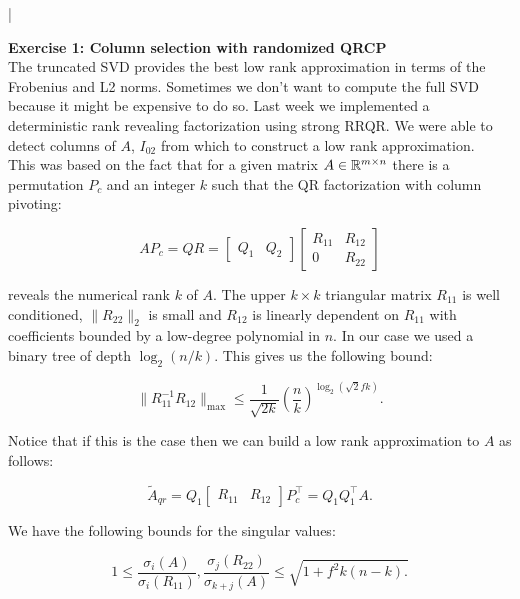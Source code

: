 \documentclass[11pt]{article}
\begin{document}
\lstset{frameround=fttt,language=Matlab}

\lstMakeShortInline[columns=fixed]|



{\bf{Exercise 1: Column selection with randomized QRCP}} \\

The truncated SVD provides the best low rank approximation in terms of the Frobenius and L2 norms. Sometimes we don't want to compute the full SVD because it might be expensive to do so. Last week we implemented a deterministic rank revealing factorization using strong RRQR. We were able to detect columns of $A$, $I_{02}$ from which to construct a low rank approximation. \\

This was based on the fact that for a given matrix $A \in \mathbb{R}^{m \times n}$ there is a permutation $P_c$ and an integer $k$ such that the QR factorization with column pivoting:

\[ AP_{c} = QR = \begin{bmatrix} Q_1 & Q_2 \end{bmatrix} \begin{bmatrix} R_{11} & R_{12} \\ 0 & R_{22} \end{bmatrix} \]

reveals the numerical rank $k$ of $A$. The upper $k \times k$ triangular matrix $R_{11}$ is well conditioned, $\|R_{22}\|_2$ is small and $R_{12}$ is linearly dependent on $R_{11}$ with coefficients bounded by a low-degree polynomial in $n$. In our case we used a binary tree of depth $\log_2\left(n/k\right).$ This gives us the following bound:

\[ \|R_{11}^{-1}R_{12}\|_{\max} \leq \frac{1}{\sqrt{2k}} \left(\frac{n}{k}\right)^{\log_2\left(\sqrt{2}fk\right)} . \]


Notice that if this is the case then we can build a low rank approximation to $A$ as follows:

\[ \tilde{A}_{qr} = Q_{1} \begin{bmatrix} R_{11} & R_{12} \end{bmatrix} P_{c}^{\top} = Q_{1}Q_{1}^\top A. \]

We have the following bounds for the singular values:

\[ 1 \leq \frac{\sigma_{i}(A)}{\sigma_{i}(R_11) }, \frac{\sigma_j(R_{22})}{\sigma_{k+j}(A)} \leq \sqrt{ 1 + f^2k(n-k). } \]
\end{document}
